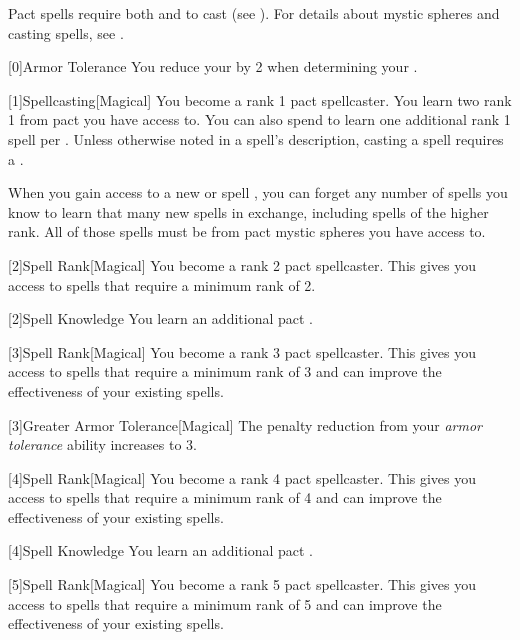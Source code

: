         Pact spells require both  and  to cast (see ).
        For details about mystic spheres and casting spells, see .

        [0]{Armor Tolerance} You reduce your  by 2 when determining your .

        [1]{Spellcasting}[Magical]
        You become a rank 1 pact spellcaster.
        You learn two rank 1  from pact  you have access to.
        You can also spend  to learn one additional rank 1 spell per .
        Unless otherwise noted in a spell's description, casting a spell requires a .

        When you gain access to a new  or spell ,
            you can forget any number of spells you know to learn that many new spells in exchange,
            including spells of the higher rank.
        All of those spells must be from pact mystic spheres you have access to.

        [2]{Spell Rank}[Magical] You become a rank 2 pact spellcaster.
        This gives you access to spells that require a minimum rank of 2.

        [2]{Spell Knowledge} You learn an additional pact .

        [3]{Spell Rank}[Magical] You become a rank 3 pact spellcaster.
        This gives you access to spells that require a minimum rank of 3 and can improve the effectiveness of your existing spells.

        [3]{Greater Armor Tolerance}[Magical] The penalty reduction from your \textit{armor tolerance} ability increases to 3.

        [4]{Spell Rank}[Magical] You become a rank 4 pact spellcaster.
        This gives you access to spells that require a minimum rank of 4 and can improve the effectiveness of your existing spells.

        [4]{Spell Knowledge} You learn an additional pact .

        [5]{Spell Rank}[Magical] You become a rank 5 pact spellcaster.
        This gives you access to spells that require a minimum rank of 5 and can improve the effectiveness of your existing spells.

